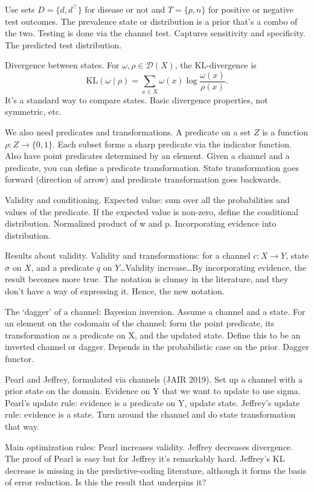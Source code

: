 Use sets $D = \{d, d^\top\}$ for disease or not and $T = \{p, n\}$ for positive or
negative test outcomes.
The prevalence state or distribution is a prior that's a combo of the two.
Testing is done via the channel test.
Captures sensitivity and specificity.
The predicted test distribution.

Divergence between states.
For $\omega, \rho \in \mathcal{D}(X)$, the KL-divergence is
\begin{equation*}
  \text{KL}(\omega \mid \rho) = \sum_{x \in X} \omega(x) \log \frac{\omega(x)}{\rho(x)}.
\end{equation*}
It's a standard way to compare states.
Basic divergence properties, not symmetric, etc.

We also need
predicates and transformations.
A predicate on a set $Z$ is a function $\rho \colon Z \to \{0, 1\}$.
Each subset forms a sharp predicate via the indicator function.
Also have point predicates determined by an element.
Given a channel and a predicate, you can define a predicate transformation.
State transformation goes forward (direction of arrow) and predicate transformation
goes backwards.

Validity and conditioning.
Expected value: sum over all the probabilities and values of the predicate.
If the expected value is non-zero, define the conditional distribution.
Normalized product of w and p.
Incorporating evidence into distribution.

Results about validity.
Validity and transformations: for a channel $c : X \to Y$, state $\sigma$ on $X$, and a
predicate $q$ on $Y$\dots Validity increase\dots By incorporating evidence, the result
becomes more true.
The notation is clumsy in the literature, and they don't have a way of expressing it.
Hence, the new notation.

The `dagger' of a channel: Bayesian inversion.
Assume a channel and a state.
For an element on the codomain of the channel: form the point predicate, its
transformation as a predicate on X, and the updated state.
Define this to be an inverted channel or dagger.
Depends in the probabilistic case on the prior.
Dagger functor.

Pearl and Jeffrey, formulated via channels (JAIR 2019).
Set up a channel with a prior state on the domain.
Evidence on Y that we want to update to use sigma.
Pearl's update rule: evidence is a predicate on Y, update state.
Jeffrey's update rule: evidence is a state.
Turn around the channel and do state transformation that way.

Main optimization rules: Pearl increases validity.
Jeffrey decreases divergence.
The proof of Pearl is easy but for Jeffrey it's remarkably hard.
Jeffrey's KL decrease is missing in the predictive-coding literature, although it forms
the basis of error reduction.
Is this the result that underpins it?

